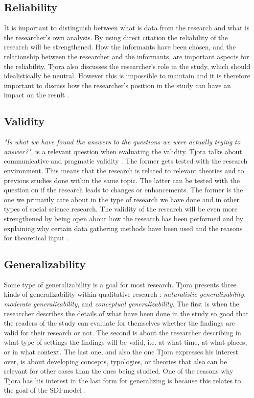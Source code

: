 \subsection{Reliability}
It is important to distinguish between what is data from the research and what is the researcher's own analysis. By using direct citation the reliability of the research will be strengthened. How the informants have been chosen, and the relationship between the researcher and the informants, are important aspects for the reliability. Tjora also discusses the researcher's role in the study, which should idealistically be neutral. However this is impossible to maintain and it is therefore important to discuss how the researcher's position in the study can have an impact on the result \cite{tjora}.

\subsection{Validity}
\emph{"Is what we have found the answers to the questions we were actually trying to answer?"}, is a relevant question when evaluating the validity. Tjora talks about communicative and pragmatic validity \cite{tjora}. The former gets tested with the research environment. This means that the research is related to relevant theories and to previous studies done within the same topic. The latter can be tested with the question on if the research leads to changes or enhancements. The former is the one we primarily care about in the type of research we have done and  in other types of social science research. The validity of the research will be even more strengthened by being open about how the research has been performed and by explaining why certain data gathering methods have been used and the reasons for theoretical input \cite{tjora}. 

\subsection{Generalizability}
Some type of generalizability is a goal for most research. Tjora presents three kinds of generalizability within qualitative research \cite{tjora}: \emph{naturalistic generalizability}, \emph{moderate generalizability}, and \emph{conceptual generalizability}. The first is when the researcher describes the details of what have been done in the study so good that the readers of the study can evaluate for themselves whether the findings are valid for their research or not. The second is about the researcher describing in what type of settings the findings will be valid, i.e. at what time, at what places, or in what context. The last one, and also the one Tjora expresses his interest over, is about developing concepts, typologies, or theories that also can be relevant for other cases than the ones being studied. One of the reasons why Tjora has his interest in the last form for generalizing is because this relates to the goal of the SDI-model \cite{tjora}.

